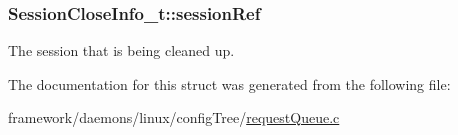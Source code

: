 \subsubsection[{\texorpdfstring{session\+Ref}{sessionRef}}]{ Session\+Close\+Info\+\_\+t\+::session\+Ref}\hypertarget{struct_session_close_info__t_abc1fcb8d925780289890fc7ae2de7f17}{}\label{struct_session_close_info__t_abc1fcb8d925780289890fc7ae2de7f17}


The session that is being cleaned up. 



The documentation for this struct was generated from the following file\+:\begin{DoxyCompactItemize}
\item 
framework/daemons/linux/config\+Tree/\hyperlink{request_queue_8c}{request\+Queue.\+c}\end{DoxyCompactItemize}

